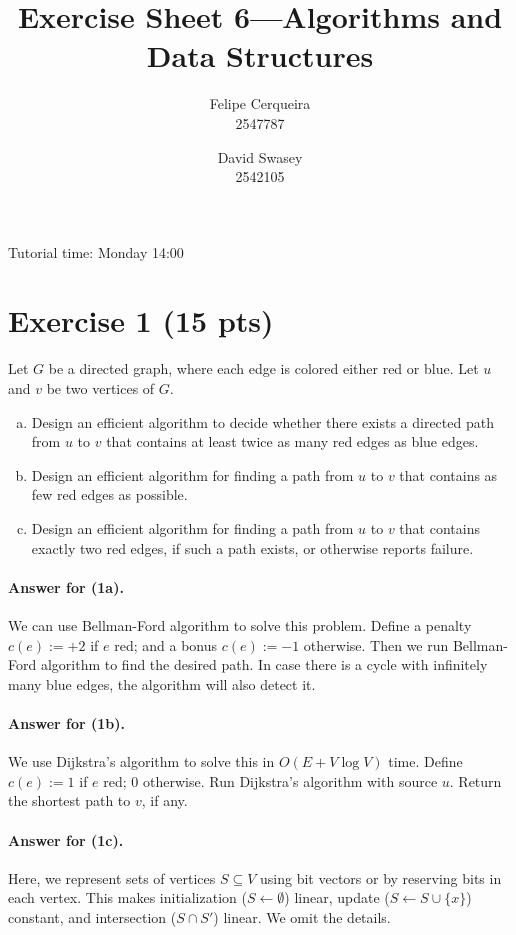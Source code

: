 \documentclass[a4paper]{article}
\title{Exercise Sheet 6---Algorithms and Data Structures}
\author{Felipe Cerqueira \\ 2547787 \and David Swasey \\ 2542105}
\begin{document}
\maketitle

Tutorial time: Monday 14:00

\section*{Exercise 1 (15 pts)}

Let $G$ be a directed graph, where each edge is colored either red or blue.
Let $u$ and $v$ be two vertices of $G$.
\begin{enumerate}[a)]
	\item Design an efficient algorithm to decide whether there exists a directed path from $u$ to $v$ that contains at least twice as many red edges as blue edges.
	
	\item Design an efficient algorithm for finding a path from $u$ to $v$ that contains as few red edges as possible.
	
	\item Design an efficient algorithm for finding a path from $u$ to $v$ that contains exactly two red edges, if such a path exists, or otherwise reports failure.
\end{enumerate}

\paragraph{Answer for (1a).}

We can use Bellman-Ford algorithm to solve this problem. Define a penalty $c(e) := +2$ if $e$ red; and a bonus $c(e) := -1$ otherwise. Then we run Bellman-Ford algorithm to find the desired path. In case there is a cycle with infinitely many blue edges, the algorithm will also detect it.

\paragraph{Answer for (1b).}
We use Dijkstra's algorithm to solve this in $O(E + V \log V)$ time.
	Define $c(e) := 1$ if $e$ red; $0$ otherwise.
	Run Dijkstra's algorithm with source $u$.
	Return the shortest path to $v$, if any.

\paragraph{Answer for (1c).}
Here, we represent sets of vertices $S \subseteq V$ using bit vectors or by reserving bits in each vertex.
This makes initialization ($S \gets \emptyset$) linear, update ($S \gets S \cup \{ x \}$) constant, and intersection ($S \cap S'$) linear.
We omit the details.
\end{document}
